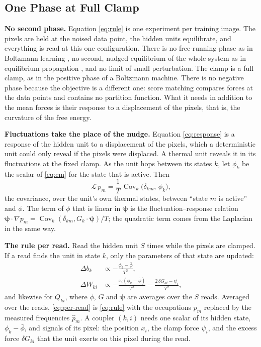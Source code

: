 \documentclass{article}
\newcommand{\gen}{\mathcal{L}}            %
\DeclareMathOperator{\Cov}{Cov}
\begin{document}
\subsection{One Phase at Full Clamp}
\label{sec:onephase}

\textbf{No second phase.}
Equation \eqref{eq:rule} is one experiment per training image. The pixels are
held at the noised data point, the hidden units equilibrate, and everything is
read at this one configuration. There is no free-running phase as in
Boltzmann learning \citep{hinton2002training,jelincic2025dtm}, no second,
nudged equilibrium of the whole system as in equilibrium propagation
\citep{scellier2017equilibrium}, and no limit of small perturbation. The clamp
is a full clamp, as in the positive phase of a Boltzmann machine. There is no
negative phase because the objective is a different one: score matching compares
forces at the data points and contains no partition function. What it needs in
addition to the mean forces is their response to a displacement of the pixels,
that is, the curvature of the free energy.

\textbf{Fluctuations take the place of the nudge.}
Equation \eqref{eq:response} is a response of the hidden unit to a
displacement of the pixels, which a deterministic unit could only reveal if
the pixels were displaced. A thermal unit reveals it in its fluctuations at
the fixed clamp. As the unit hops between its states $k$, let $\phi_k$ be the
scalar of \eqref{eq:cm} for the state that is active. Then
\begin{equation}
  \gen\,p_m = \frac{1}{T}\,\Cov_k\bigl(\delta_{km},\,\phi_k\bigr) ,
  \label{eq:cov}
\end{equation}
the covariance, over the unit's own thermal states, between ``state $m$ is
active'' and $\phi$. The term of $\phi$ that is linear in $\bm{\psi}$ is the
fluctuation--response relation
$\bm{\psi}\!\cdot\!\nabla p_m=\Cov_k(\delta_{km},G_k\!\cdot\!\bm{\psi})/T$; the
quadratic term comes from the Laplacian in the same way.

\textbf{The rule per read.}
Read the hidden unit $S$ times while the pixels are clamped. If a read finds
the unit in state $k$, only the parameters of that state are updated:
\begin{align}
  \Delta b_k &\propto -\frac{\phi_k-\bar\phi}{T^{3}} , \nonumber\\
  \Delta W_{ki} &\propto -\frac{x_i(\phi_k-\bar\phi)}{T^{3}}
                 -\frac{2\,\delta G_{ki}-\psi_i}{T^{2}} ,
  \label{eq:per-read}
\end{align}
and likewise for $Q_{ki}$, where $\bar\phi$, $\bar G$ and $\bm{\psi}$ are
averages over the $S$ reads. Averaged over the reads, \eqref{eq:per-read} is
\eqref{eq:rule} with the occupations $p_m$ replaced by the measured
frequencies $\hat p_m$. A coupler $(k,i)$ needs one scalar of its hidden state,
$\phi_k-\bar\phi$, and signals of its pixel: the position $x_i$, the clamp
force $\psi_i$, and the excess force $\delta G_{ki}$ that the unit exerts on
this pixel during the read.
\end{document}
